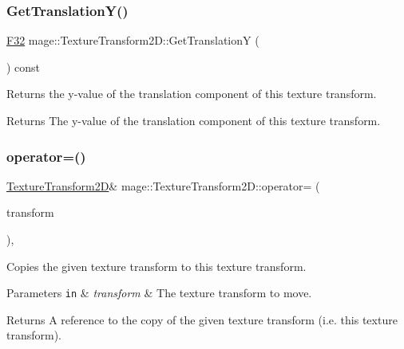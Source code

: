 \subsubsection{\texorpdfstring{Get\+Translation\+Y()}{GetTranslationY()}}
{\footnotesize\ttfamily \mbox{\hyperlink{namespacemage_aa97e833b45f06d60a0a9c4fc22ae02c0}{F32}} mage\+::\+Texture\+Transform2\+D\+::\+Get\+TranslationY (\begin{DoxyParamCaption}{ }\end{DoxyParamCaption}) const\hspace{0.3cm}{\ttfamily [noexcept]}}

Returns the y-\/value of the translation component of this texture transform.

\begin{DoxyReturn}{Returns}
The y-\/value of the translation component of this texture transform. 
\end{DoxyReturn}
\mbox{\label{classmage_1_1_texture_transform2_d_ac99bc6d9f6d4995072d63b569bf8a2df}} 
\subsubsection{\texorpdfstring{operator=()}{operator=()}\hspace{0.1cm}{\footnotesize\ttfamily [1/2]}}
{\footnotesize\ttfamily \mbox{\hyperlink{classmage_1_1_texture_transform2_d}{Texture\+Transform2D}}\& mage\+::\+Texture\+Transform2\+D\+::operator= (\begin{DoxyParamCaption}\item[{const \mbox{\hyperlink{classmage_1_1_texture_transform2_d}{Texture\+Transform2D}} \&}]{transform }\end{DoxyParamCaption})\hspace{0.3cm}{\ttfamily [default]}, {\ttfamily [noexcept]}}

Copies the given texture transform to this texture transform.


\begin{DoxyParams}[1]{Parameters}
\mbox{\tt in}  & {\em transform} & The texture transform to move. \\
\hline
\end{DoxyParams}
\begin{DoxyReturn}{Returns}
A reference to the copy of the given texture transform (i.\+e. this texture transform). 
\end{DoxyReturn}
\mbox{\label{classmage_1_1_texture_transform2_d_a7b793ceb3ad9eabf7269f82b2bfe1ef8}} 
